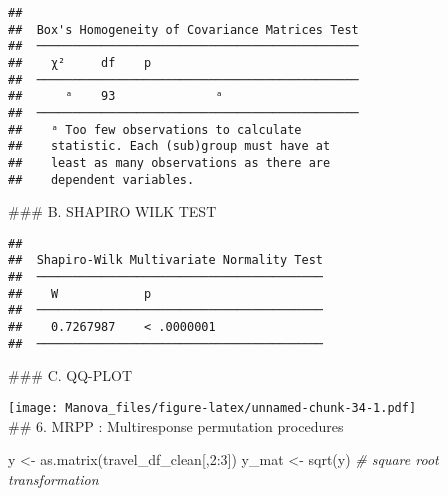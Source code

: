 \documentclass[
]{article}
\newenvironment{Shaded}{\begin{snugshade}}{\end{snugshade}}
\newcommand{\CommentTok}[1]{\textcolor[rgb]{0.56,0.35,0.01}{\textit{#1}}}
\newcommand{\DecValTok}[1]{\textcolor[rgb]{0.00,0.00,0.81}{#1}}
\newcommand{\FunctionTok}[1]{\textcolor[rgb]{0.00,0.00,0.00}{#1}}
\newcommand{\NormalTok}[1]{#1}
\newcommand{\OtherTok}[1]{\textcolor[rgb]{0.56,0.35,0.01}{#1}}
\newcommand{\SpecialCharTok}[1]{\textcolor[rgb]{0.00,0.00,0.00}{#1}}
\begin{document}
\begin{verbatim}
## 
##  Box's Homogeneity of Covariance Matrices Test 
##  ───────────────────────────────────────────── 
##    χ²     df    p             
##  ───────────────────────────────────────────── 
##      ᵃ    93              ᵃ   
##  ───────────────────────────────────────────── 
##    ᵃ Too few observations to calculate
##    statistic. Each (sub)group must have at
##    least as many observations as there are
##    dependent variables.
\end{verbatim}

\hfill\break
\#\#\# B. SHAPIRO WILK TEST

\begin{Shaded}
\end{Shaded}

\begin{verbatim}
## 
##  Shapiro-Wilk Multivariate Normality Test 
##  ──────────────────────────────────────── 
##    W            p            
##  ──────────────────────────────────────── 
##    0.7267987    < .0000001   
##  ────────────────────────────────────────
\end{verbatim}

\hfill\break
\#\#\# C. QQ-PLOT

\begin{Shaded}
\end{Shaded}

\texttt{[image: Manova\_files/figure-latex/unnamed-chunk-34-1.pdf]}\\
\#\# 6. MRPP : Multiresponse permutation procedures

\begin{Shaded}
\begin{Highlighting}[]
\NormalTok{y }\OtherTok{\textless{}{-}} \FunctionTok{as.matrix}\NormalTok{(travel\_df\_clean[,}\DecValTok{2}\SpecialCharTok{:}\DecValTok{3}\NormalTok{])}
\NormalTok{y\_mat }\OtherTok{\textless{}{-}} \FunctionTok{sqrt}\NormalTok{(y) }\CommentTok{\# square root transformation}
\end{Highlighting}
\end{Shaded}
\end{document}
